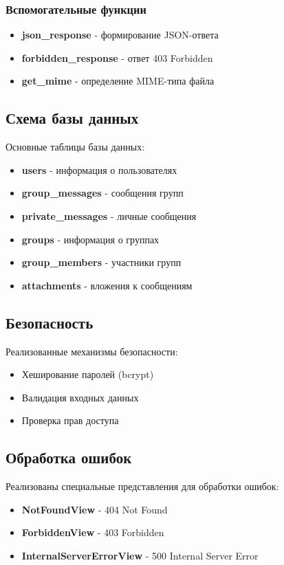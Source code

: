 \subsubsection{Вспомогательные функции}

\begin{itemize}
	\item \textbf{json\_response} - формирование JSON-ответа
	\item \textbf{forbidden\_response} - ответ 403 Forbidden
	\item \textbf{get\_mime} - определение MIME-типа файла
\end{itemize}

\subsection{Схема базы данных}

Основные таблицы базы данных:
\begin{itemize}
	\item \textbf{users} - информация о пользователях
	\item \textbf{group\_messages} - сообщения групп
	\item \textbf{private\_messages} - личные сообщения
	\item \textbf{groups} - информация о группах
	\item \textbf{group\_members} - участники групп
	\item \textbf{attachments} - вложения к сообщениям
\end{itemize}

\subsection{Безопасность}

Реализованные механизмы безопасности:
\begin{itemize}
	\item Хеширование паролей (bcrypt)
	\item Валидация входных данных
	\item Проверка прав доступа
\end{itemize}

\subsection{Обработка ошибок}

Реализованы специальные представления для обработки ошибок:
\begin{itemize}
	\item \textbf{NotFoundView} - 404 Not Found
	\item \textbf{ForbiddenView} - 403 Forbidden
	\item \textbf{InternalServerErrorView} - 500 Internal Server Error
\end{itemize}